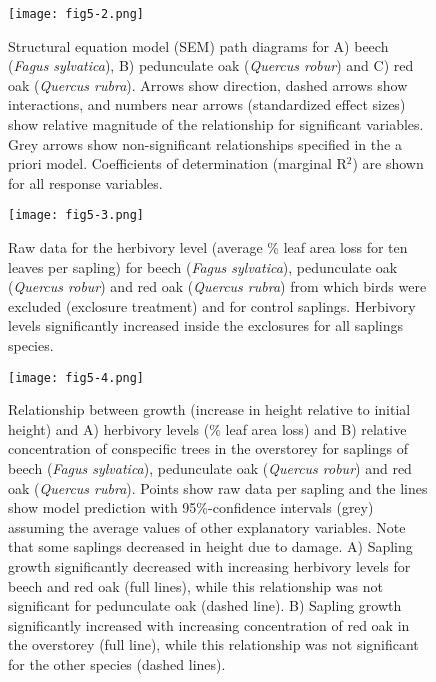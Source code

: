 \documentclass[10pt, twoside]{book} %
\begin{document}
\begin{figure}[h!]
	\begin{center}
			\texttt{[image: fig5-2.png]}
	\end{center}
	\caption{Structural equation model (SEM) path diagrams for A) beech (\textit{Fagus sylvatica}), B) pedunculate oak (\textit{Quercus robur}) and C) red oak (\textit{Quercus rubra}). Arrows show direction, dashed arrows show interactions, and numbers near arrows (standardized effect sizes) show relative magnitude of the relationship for significant variables. Grey arrows show non-significant relationships specified in the a priori model. Coefficients of determination (marginal R$^2$) are shown for all response variables. \label{fig5-2}}
\end{figure}

\begin{figure}[h!]
	\begin{center}
		\texttt{[image: fig5-3.png]}
	\end{center}
	\caption{Raw data for the herbivory level (average \% leaf area loss for ten leaves per sapling) for beech (\textit{Fagus sylvatica}), pedunculate oak (\textit{Quercus robur}) and red oak (\textit{Quercus rubra}) from which birds were excluded (exclosure treatment) and for control saplings. Herbivory levels significantly increased inside the exclosures for all saplings species.\label{fig5-3}}
\end{figure}

\begin{figure}[h!]
	\begin{center}
		\texttt{[image: fig5-4.png]}
	\end{center}
	\caption{Relationship between growth (increase in height relative to initial height) and A) herbivory levels (\% leaf area loss) and B) relative concentration of conspecific trees in the overstorey for saplings of beech (\textit{Fagus sylvatica}), pedunculate oak (\textit{Quercus robur}) and red oak (\textit{Quercus rubra}). Points show raw data per sapling and the lines show model prediction with 95\%-confidence intervals (grey) assuming the average values of other explanatory variables. Note that some saplings decreased in height due to damage. A) Sapling growth significantly decreased with increasing herbivory levels for beech and red oak (full lines), while this relationship was not significant for pedunculate oak (dashed line). B) Sapling growth significantly increased with increasing concentration of red oak in the overstorey (full line), while this relationship was not significant for the other species (dashed lines).\label{fig5-4}}
\end{figure}
\end{document}
